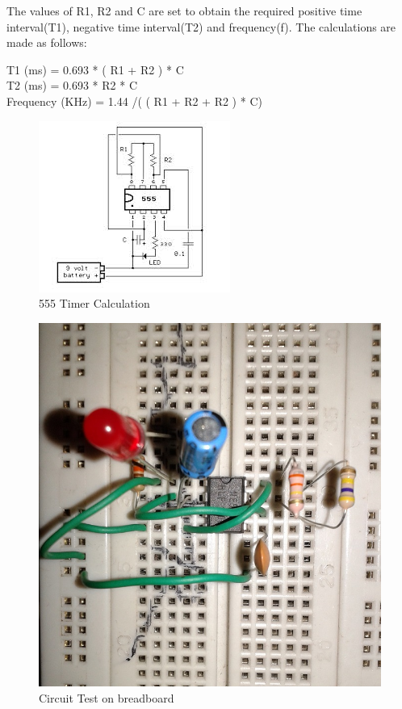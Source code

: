 \documentclass[12pt, a4paper]{article}
\begin{document}
	The values of R1, R2 and C are set to obtain the required positive time interval(T1), negative time interval(T2) and frequency(f). The calculations are made as follows:

	\noindent
	T1 (ms) = 0.693 * ( R1 + R2 ) * C \\
	T2 (ms)  = 0.693 * R2 * C \\
	Frequency (KHz)  = 1.44 /( ( R1 + R2 + R2 ) * C)

\begin{figure}[htp]
	\centering
	\includegraphics[scale=0.67]{blinking.jpg}
	\caption{555 Timer Calculation}
	\label{}
\end{figure}

\begin{figure}[htp]
	\centering
	\includegraphics[scale=0.15]{circuit.jpg}
	\caption{Circuit Test on breadboard}
	\label{}
\end{figure}
\end{document}
